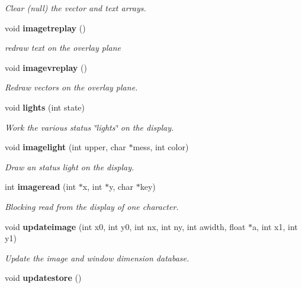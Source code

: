 \begin{CompactItemize}
\begin{CompactList}\small\item\em Clear (null) the vector and text arrays. \item\end{CompactList}\item 
void {\bf imagetreplay} ()\label{xtvutils_8c_a184}

\begin{CompactList}\small\item\em redraw text on the overlay plane \item\end{CompactList}\item 
void {\bf imagevreplay} ()\label{xtvutils_8c_a185}

\begin{CompactList}\small\item\em Redraw vectors on the overlay plane. \item\end{CompactList}\item 
void {\bf lights} (int state)
\begin{CompactList}\small\item\em Work the various status \char`\"{}lights\char`\"{} on the display. \item\end{CompactList}\item 
void {\bf imagelight} (int upper, char $\ast$mess, int color)
\begin{CompactList}\small\item\em Draw an status light on the display. \item\end{CompactList}\item 
int {\bf imageread} (int $\ast$x, int $\ast$y, char $\ast$key)
\begin{CompactList}\small\item\em Blocking read from the display of one character. \item\end{CompactList}\item 
void {\bf updateimage} (int x0, int y0, int nx, int ny, int awidth, float $\ast$a, int x1, int y1)
\begin{CompactList}\small\item\em Update the image and window dimension database. \item\end{CompactList}\item 
void {\bf updatestore} ()\label{xtvutils_8c_a190}


\end{CompactItemize}
